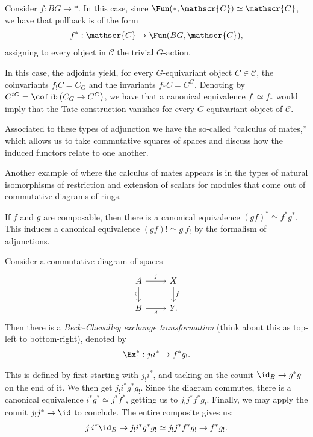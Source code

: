 \begin{example} Consider $f: BG \to \ast$. In this case, since $\Fun(\ast, \mathscr{C}) \simeq \mathscr{C}$, we have that pullback is of the form
\begin{align*}
    f^\ast: \mathscr{C} \to \Fun(BG,\mathscr{C}),
\end{align*}
assigning to every object in $\mathscr{C}$ the trivial $G$-action.

In this case, the adjoints yield, for every $G$-equivariant object $C \in \mathscr{C}$, the coinvariants $f_! C = C_G$ and the invariants $f_\ast C = C^G$. Denoting by $C^{tG} = \cofib \left( C_G \to C^G \right)$, we have that a canonical equivalence $f_! \simeq f_\ast$ would imply that the Tate construction vanishes for every $G$-equivariant object of $\mathscr{C}$.
\end{example}





Associated to these types of adjunction we have the so-called ``calculus of mates,'' which allows us to take commutative squares of spaces and discuss how the induced functors relate to one another.

Another example of where the calculus of mates appears is in the types of natural isomorphisms of restriction and extension of scalars for modules that come out of commutative diagrams of rings.

\begin{proposition} If $f$ and $g$ are composable, then there is a canonical equivalence $(gf)^\ast \simeq f^\ast g^\ast$. This induces a canonical equivalence $(gf)! \simeq g_! f_!$ by the formalism of adjunctions.
\end{proposition}


\begin{definition} Consider a commutative diagram of spaces
\[ \begin{tikzcd}
    A\rar["j"]\dar["i" left] & X\dar["f" right]\\
    B\rar["g" below] & Y.
\end{tikzcd} \]
Then there is a \textit{Beck--Chevalley exchange transformation} (think about this as top-left to bottom-right), denoted by
\begin{align*}
    \Ex_!^\ast : j_! i^\ast \to f^\ast g_!. 
\end{align*}
\end{definition}
This is defined by first starting with $j_! i^\ast$, and tacking on the counit $\id_B \to g^\ast g_!$ on the end of it. We then get $j_! i^\ast g^\ast g_!$. Since the diagram commutes, there is a canonical equivalence $i^\ast g^\ast \simeq j^\ast f^\ast$, getting us to $j_! j^\ast f^\ast g_!$. Finally, we may apply the counit $j_! j^\ast \to \id$ to conclude. The entire composite gives us:
\begin{align*}
    j_! i^\ast \id_B \to j_! i^\ast g^\ast g_! \simeq j_! j^\ast f^\ast g_! \to f^\ast g_!.
\end{align*}

